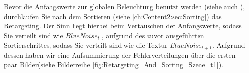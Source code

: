 Bevor die Anfangswerte zur globalen Beleuchtung benutzt werden (siehe auch ), durchlaufen Sie nach dem Sortieren 
(siehe \ref{ch:Content2:sec:Sorting}) das Retargeting. Der Sinn liegt hierbei beim Vertauschen der Anfangswerte, sodass Sie 
verteilt sind wie $BlueNoise_{t}$ , aufgrund des zuvor ausgeführten Sortierschrittes,
sodass Sie verteilt sind wie die Textur $BlueNoise_{t+1}$. Aufgrund dessen haben wir eine Aufsummierung der
 Fehlerverteilungen über die ersten paar Bilder(siehe Bilderreihe \ref{fig:Retargeting_And_Sorting_Szene_t1}).

\begin{figure}[H]



\end{figure}
